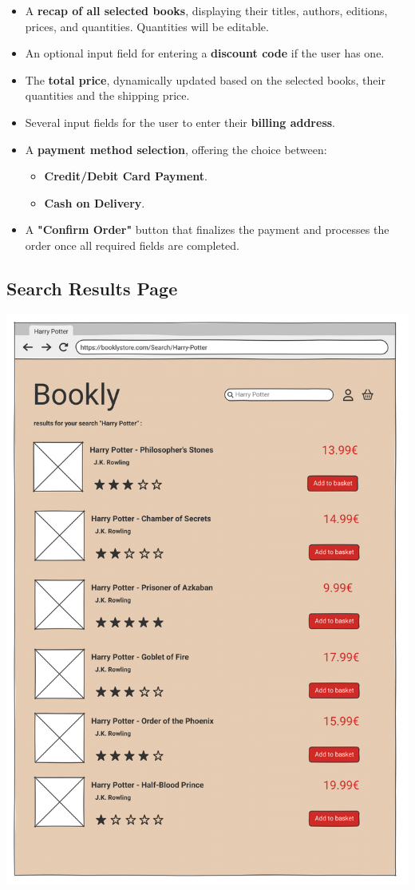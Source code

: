 \begin{itemize}
    \item A \textbf{recap of all selected books}, displaying their titles, authors, editions, prices, and quantities. Quantities will be editable.
    \item An optional input field for entering a \textbf{discount code} if the user has one.
    \item The \textbf{total price}, dynamically updated based on the selected books, their quantities and the shipping price.
    \item Several input fields for the user to enter their \textbf{billing address}.
    \item A \textbf{payment method selection}, offering the choice between:
    \begin{itemize}
        \item \textbf{Credit/Debit Card Payment}.
        \item \textbf{Cash on Delivery}.
    \end{itemize}
    
    \item A \textbf{"Confirm Order"} button that finalizes the payment and processes the order once all required fields are completed.
\end{itemize}



\subsection{Search Results Page} \label{sec:search}

\includegraphics[width=0.6\linewidth]{HW1Report/photos/searchpage.png}

